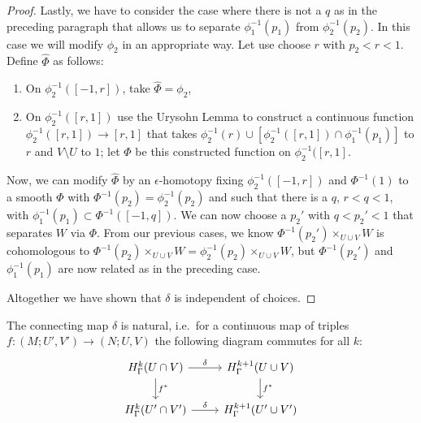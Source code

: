 \begin{proof}
	Lastly, we have to consider the case where there is not a $q$ as in the preceding paragraph that allows us to separate $\phi_1^{-1}(p_1)$ from $\phi_2^{-1}(p_2)$.
	In this case we will modify $\phi_2$ in an appropriate way.
	Let use choose $r$ with $p_2 <r<1$.
	Define $\hat \Phi$ as follows:

	\begin{enumerate}
		\item On $\phi_2^{-1}([-1,r])$, take $\hat \Phi = \phi_2$,

		\item On $\phi_2^{-1}([r,1])$ use the Urysohn Lemma to construct a continuous function $\phi_2^{-1}([r,1]) \to [r,1]$ that takes $\phi_2^{-1}(r) \cup [\phi_2^{-1}([r,1]) \cap \phi_1^{-1}(p_1)]$ to $r$ and $V\setminus U$ to $1$; let $\hat \Phi$ be this constructed function on $\phi_2^{-1}([r,1]$.
	\end{enumerate}

	Now, we can modify $\hat \Phi$ by an $\epsilon$-homotopy fixing $\phi_2^{-1}([-1,r])$ and $\Phi^{-1}(1)$ to a smooth $\Phi$ with $\Phi^{-1}(p_2) = \phi_2^{-1}(p_2)$ and such that there is a $q$, $r<q<1$, with $\phi_1^{-1}(p_1) \subset \Phi^{-1}([-1,q])$.
	We can now choose a $p_2'$ with $q<p_2'<1$ that separates $W$ via $\Phi$.
	From our previous cases, we know $\Phi^{-1}(p_2')\times_{U \cup V}W$ is cohomologous to $\Phi^{-1}(p_2)\times_{U \cup V}W = \phi_2^{-1}(p_2)\times_{U \cup V}W$, but $\Phi^{-1}(p_2')$ and $\phi_1^{-1}(p_1)$ are now related as in the preceding case.

	Altogether we have shown that $\delta$ is independent of choices.
\end{proof}

\begin{lemma}\label{L: natural connection}
	The connecting map $\delta$ is natural, i.e.\ for a continuous map of triples $f \colon (M;U',V') \to (N;U,V)$ the following diagram commutes for all $k$:
	\[
	\begin{tikzcd}
		H^k_\Gamma(U \cap V) \arrow[r, "\delta"] \arrow[d, "f^*"] & H^{k+1}_\Gamma(U \cup V) \arrow[d, "f^*"] \\
		H^k_\Gamma(U' \cap V') \arrow[r, "\delta"] & H^{k+1}_\Gamma(U' \cup V')
	\end{tikzcd}
	\]
\end{lemma}

